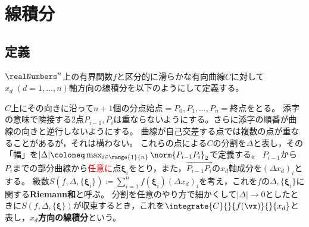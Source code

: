 \chapter{線積分}
    \section{定義}
        $\realNumbers^n$上の有界関数$f$と区分的に滑らかな有向曲線$C$に対して$x_d\;(d=1,\dotsc,n)$軸方向の線積分を以下のようにして定義する。
        \par
        $C$上にその向きに沿って$n+1$個の分点\quad$\text{始点} = P_0, P_1, \dotsc, P_n = \text{終点}$\quad をとる。
        添字の意味で隣接する2点$P_{i-1},P_i$は重ならないようにする。さらに添字の順番が曲線の向きと逆行しないようにする。
        曲線が自己交差する点では複数の点が重なることがあるが，それは構わない。
        これらの点による$C$の分割を$\Delta$と表し，その「幅」を$|\Delta| \coloneq \max_{i\in\range{1}{n}}\norm{P_{i-1}P_i}_2$で定義する。
        $P_{i-1}$から$P_i$までの部分曲線から\textcolor{red}{任意に}点$\bm{\xi}_i$をとり，また，$\overrightarrow{P_{i-1}P_i}$の$x_d$軸成分を$(\Delta x_d)_i$とする。
        級数$S(f,\Delta,\{\bm{\xi}_i\}) \coloneq \sum_{i=1}^n f(\bm{\xi}_i)(\Delta x_d)_i$を考え，これを$f$の$\Delta, \{\bm{\xi}_i\}$に関する\textbf{Riemann和}と呼ぶ。
        分割を任意のやり方で細かくして$|\Delta|\to 0$としたときに$S(f,\Delta,\{\bm{\xi}\})$が収束するとき，これを$\integrate{C}{}{f(\vx)}{}{x_d}$と表し，\textbf{$x_d$方向の線積分}という。
